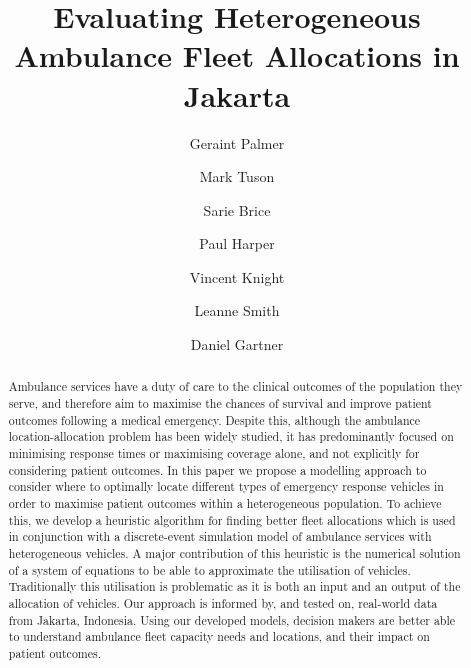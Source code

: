 \documentclass[preprint,12pt]{elsarticle}
\begin{document}
\begin{frontmatter}


\title{Evaluating Heterogeneous Ambulance Fleet Allocations in Jakarta}

\author[inst1]{Geraint Palmer}
\author[inst1]{Mark Tuson}
\author[inst1]{Sarie Brice}
\author[inst1]{Paul Harper}
\author[inst1]{Vincent Knight}
\author[inst2]{Leanne Smith}
\author[inst1,inst3]{Daniel Gartner}


            



 \begin{abstract}
 Ambulance services have a duty of care to the clinical outcomes of the
 population they serve, and therefore aim to maximise the chances of survival
 and improve patient outcomes following a medical emergency. Despite this,
 although the ambulance location-allocation problem has been widely studied,
 it has predominantly focused on minimising response times or maximising
 coverage alone, and not explicitly for considering patient outcomes. In this
 paper we propose a modelling approach to consider where to optimally locate
 different types of emergency response vehicles in order to maximise patient
 outcomes within a heterogeneous population. To achieve this, we develop a
 heuristic algorithm for finding better fleet allocations which is used in
 conjunction with a discrete-event simulation model of ambulance services with
 heterogeneous vehicles. A major contribution of this heuristic is the numerical
 solution of a system of equations to be able to approximate the utilisation of
 vehicles. Traditionally this utilisation is problematic as it is both an input
 and an output of the allocation of vehicles. Our approach is informed by, and
 tested on, real-world data from Jakarta, Indonesia. Using our developed models,
 decision makers are better able to understand ambulance fleet capacity needs
 and locations, and their impact on patient outcomes.


\end{abstract}
\end{frontmatter}
\end{document}
